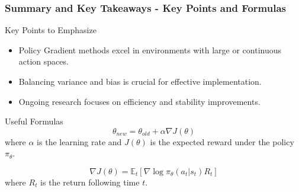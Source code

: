 \documentclass{beamer}
\begin{document}
\begin{frame}[fragile]
    \frametitle{Summary and Key Takeaways - Key Points and Formulas}
    \begin{block}{Key Points to Emphasize}
        \begin{itemize}
            \item Policy Gradient methods excel in environments with large or continuous action spaces.
            \item Balancing variance and bias is crucial for effective implementation.
            \item Ongoing research focuses on efficiency and stability improvements.
        \end{itemize}
    \end{block}
    
    \begin{block}{Useful Formulas}
        \begin{equation}
            \theta_{new} = \theta_{old} + \alpha \nabla J(\theta)
        \end{equation}
        where \( \alpha \) is the learning rate and \( J(\theta) \) is the expected reward under the policy \( \pi_\theta \).
        
        \begin{equation}
            \nabla J(\theta) = \mathbb{E}_t \left[\nabla \log \pi_\theta(a_t | s_t) R_t\right]
        \end{equation}
        where \( R_t \) is the return following time \( t \).
    \end{block}
\end{frame}
\end{document}
